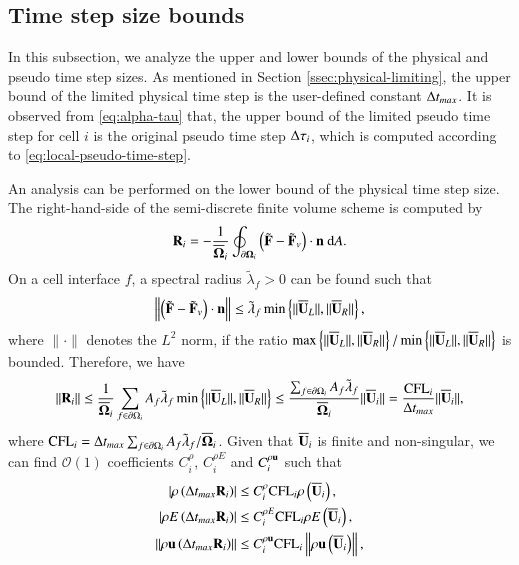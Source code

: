\subsection{Time step size bounds}
\label{ssec:analysis-time-step}
In this subsection, we analyze the upper and lower bounds of the physical and pseudo time step sizes. As mentioned in Section \ref{ssec:physical-limiting}, the upper bound of the limited physical time step is the user-defined constant $\mathrm\Delta t_{max}$. It is observed from \eqref{eq:alpha-tau} that, the upper bound of the limited pseudo time step for cell $i$ is the original pseudo time step $\mathrm\Delta \tau_i$, which is computed according to \eqref{eq:local-pseudo-time-step}. 

An analysis can be performed on the lower bound of the physical time step size.
The right-hand-side of the semi-discrete finite volume scheme is computed by
\begin{equation}
    \label{eq:Semi-FV-1}
    \mathbf{R}_i = -\frac{1}{\overline{\mathbf{\Omega}}_i} \oint_{\partial \mathbf{\Omega}_i} \left(\tilde{\mathbf{F}} - \tilde{\mathbf{F}}_v \right) \cdot \mathbf{n} \ \dd A.
\end{equation}
On a cell interface $f$, a spectral radius $\tilde{\lambda}_f>0$ can be found such that
\begin{equation}
    \left\| \left(\tilde{\mathbf{F}} - \tilde{\mathbf{F}}_v \right) \cdot \mathbf{n} \right\| \leq \tilde{\lambda}_f \min \left\{\|\overline{\mathbf{U}}_L\|, \|\overline{\mathbf{U}}_R\| \right\},
\end{equation}
where $\|\cdot\|$ denotes the $L^2$ norm, if the ratio $\max \left\{\|\overline{\mathbf{U}}_L\|, \|\overline{\mathbf{U}}_R\| \right\}/\min \left\{\|\overline{\mathbf{U}}_L\|, \|\overline{\mathbf{U}}_R\| \right\}$ is bounded.
Therefore, we have
\begin{equation}
\label{eq:upper-bound-residual}
    \left\| \mathbf{R}_i \right\| 
    \leq \frac{1}{\overline{\mathbf{\Omega}}_i} \sum_{f \in \partial \Omega_i}{
        A_{f} \tilde{\lambda}_{f} \min \left\{\|\overline{\mathbf{U}}_L\|, \|\overline{\mathbf{U}}_R\| \right\}
    } 
    \leq \frac{\sum_{f \in \partial \Omega_i} A_f\tilde{\lambda}_f}{\overline{\mathbf{\Omega}}_i}\|\overline{\mathbf{U}}_i\|
    =
    \frac{\text{CFL}_i}{\mathrm\Delta t_{max}}\|\overline{\mathbf{U}}_i\|,
\end{equation}
where $\text{CFL}_i= \mathrm\Delta t_{max}\sum_{f \in \partial \Omega_i} A_f \tilde{\lambda}_f/\overline{\mathbf{\Omega}}_i$. 
Given that $\overline{\mathbf{U}}_i$ is finite and non-singular, we can find $\mathcal{O}(1)$ coefficients $C^{\rho}_i$, $C^{\rho E}_i$ and $C^{\rho \mathbf{u}}_i$ such that
\begin{equation}
    \begin{aligned}
    \label{eq:inc_upper_cond_const_coef}
        \left| \rho\left( \mathrm\Delta t_{max} \mathbf{R}_i \right) \right|
        & \leq
        C^\rho_i    \text{CFL}_i \rho\left( \overline{\mathbf{U}}_i \right),\\
        \left| \rho E\left( \mathrm\Delta t_{max} \mathbf{R}_i \right) \right|
        & \leq
        C^{\rho E}_i \text{CFL}_i \rho E\left( \overline{\mathbf{U}}_i \right),\\
        \left\| \rho \mathbf{u}\left( \mathrm\Delta t_{max} \mathbf{R}_i \right) \right\|
        & \leq 
        C^{\rho \mathbf{u}}_i \text{CFL}_i  \left\| \rho \mathbf{u}\left( \overline{\mathbf{U}}_i \right)              \right\|,\\
    \end{aligned}
\end{equation}
